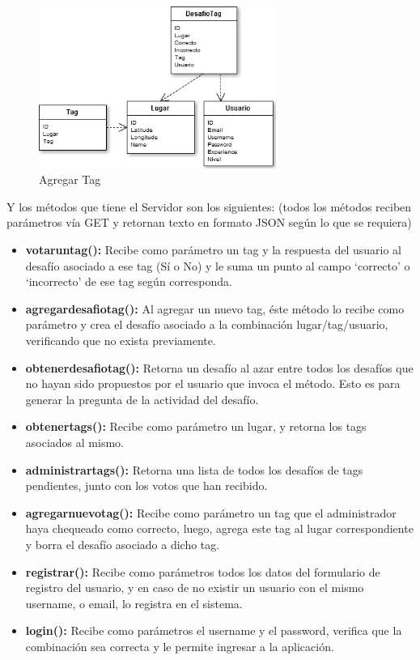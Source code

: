 \documentclass[10pt,letterpaper]{article}
\begin{document}
\begin{figure}[h]
\begin{center}
\includegraphics[width=220pt]{./imgs/ModeloDatos.png}
\caption{Agregar Tag}
\end{center}
\end{figure}

Y los métodos que tiene el Servidor son los siguientes: (todos los métodos reciben parámetros vía GET y retornan texto en formato JSON según lo que se requiera)\\

\begin{itemize}
\item \textbf{votaruntag():} Recibe como parámetro un tag y la respuesta del usuario al desafío asociado a ese tag (Sí o No) y le suma un punto al campo ‘correcto’ o ‘incorrecto’ de ese tag según corresponda.

\item \textbf{agregardesafiotag():} Al agregar un nuevo tag, éste método lo recibe como parámetro y crea el desafío asociado a la combinación lugar/tag/usuario, verificando que no exista previamente.

\item \textbf{obtenerdesafiotag():} Retorna un desafío al azar entre todos los desafíos que no hayan sido propuestos por el usuario que invoca el método. Esto es para generar la pregunta de la actividad del desafío.

\item \textbf{obtenertags():} Recibe como parámetro un lugar, y retorna los tags asociados al mismo.

\item \textbf{administrartags():} Retorna una lista de todos los desafíos de tags pendientes, junto con los votos que han recibido.

\item \textbf{agregarnuevotag():} Recibe como parámetro un tag que el administrador haya chequeado como correcto, luego, agrega este tag al lugar correspondiente y borra el desafío asociado a dicho tag.

\item \textbf{registrar():} Recibe como parámetros todos los datos del formulario de registro del usuario, y en caso de no existir un usuario con el mismo username, o email, lo registra en el sistema.

\item \textbf{login():} Recibe como parámetros el username y el password, verifica que la combinación sea correcta y le permite ingresar a la aplicación.

\end{itemize}
\end{document}
